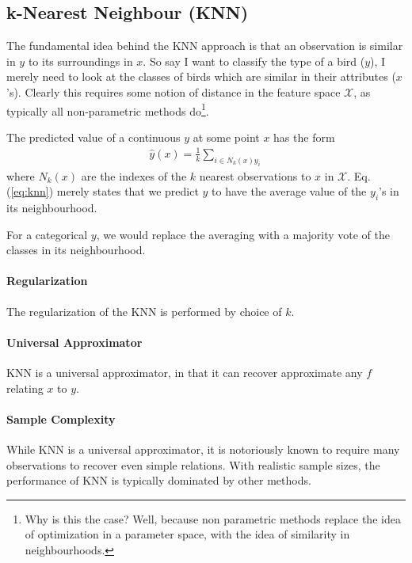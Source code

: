 \documentclass[12pt,a4paper]{article}
\theoremstyle{plain}
\theoremstyle{definition}
\newcommand{\hyp}{f}
\newcommand{\featureS}{\mathcal{X}}
\begin{document}
\subsection{k-Nearest Neighbour (KNN)}
\label{sec:knn}
The fundamental idea behind the KNN approach is that an observation is similar in $y$ to its surroundings in $x$. 
So say I want to classify the type of a bird ($y$), I merely need to look at the classes of birds which are similar in their attributes ($x$'s). 
Clearly this requires some notion of distance in the feature space $\featureS$, as typically all non-parametric methods do\footnote{Why is this the case? Well, because non parametric methods replace the idea of optimization in a parameter space, with the idea of similarity in neighbourhoods.}.

The predicted value of a continuous $y$ at some point $x$ has the form
\begin{align}
\label{eq:knn}
	\hat{y}(x)=\frac{1}{k}\sum_{i \in N_k(x) y_i}
\end{align}
where $N_k(x)$ are the indexes of the $k$ nearest observations to $x$ in $\featureS$.
Eq.(\ref{eq:knn}) merely states that we predict $y$ to have the average value of the $y_i$'s in its neighbourhood.

For a categorical $y$, we would replace the averaging with a majority vote of the classes in its neighbourhood.

\paragraph{Regularization}
The regularization of the KNN is performed by choice of $k$.

\paragraph{Universal Approximator}
KNN is a universal approximator, in that it can recover approximate any $\hyp$ relating $x$ to $y$.

\paragraph{Sample Complexity}
While KNN is a universal approximator, it is notoriously known to require many observations to recover even simple relations. With realistic sample sizes, the performance of KNN is typically dominated by other methods.
\end{document}
